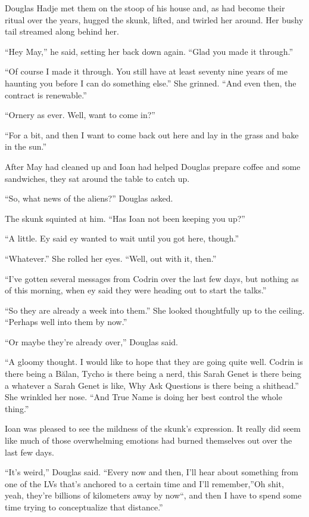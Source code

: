 Douglas Hadje met them on the stoop of his house and, as had become their ritual over the years, hugged the skunk, lifted, and twirled her around. Her bushy tail streamed along behind her.

``Hey May,'' he said, setting her back down again. ``Glad you made it through.''

``Of course I made it through. You still have at least seventy nine years of me haunting you before I can do something else.'' She grinned. ``And even then, the contract is renewable.''

``Ornery as ever. Well, want to come in?''

``For a bit, and then I want to come back out here and lay in the grass and bake in the sun.''

After May had cleaned up and Ioan had helped Douglas prepare coffee and some sandwiches, they sat around the table to catch up.

``So, what news of the aliens?'' Douglas asked.

The skunk squinted at him. ``Has Ioan not been keeping you up?''

``A little. Ey said ey wanted to wait until you got here, though.''

``Whatever.'' She rolled her eyes. ``Well, out with it, then.''

``I've gotten several messages from Codrin over the last few days, but nothing as of this morning, when ey said they were heading out to start the talks.''

``So they are already a week into them.'' She looked thoughtfully up to the ceiling. ``Perhaps well into them by now.''

``Or maybe they're already over,'' Douglas said.

``A gloomy thought. I would like to hope that they are going quite well. Codrin is there being a Bălan, Tycho is there being a nerd, this Sarah Genet is there being a whatever a Sarah Genet is like, Why Ask Questions is there being a shithead.'' She wrinkled her nose. ``And True Name is doing her best control the whole thing.''

Ioan was pleased to see the mildness of the skunk's expression. It really did seem like much of those overwhelming emotions had burned themselves out over the last few days.

``It's weird,'' Douglas said. ``Every now and then, I'll hear about something from one of the LVs that's anchored to a certain time and I'll remember,''Oh shit, yeah, they're billions of kilometers away by now``, and then I have to spend some time trying to conceptualize that distance.''

